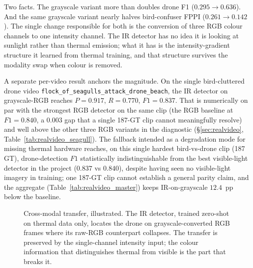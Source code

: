 \documentclass[12pt,a4paper,oneside,openright]{book}
\begin{document}
Two facts. The grayscale variant more than doubles drone F1 ($0.295 \to 0.636$). And the same grayscale variant nearly halves bird-confuser FPPI ($0.261 \to 0.142$). The single change responsible for both is the conversion of three RGB colour channels to one intensity channel. The IR detector has no idea it is looking at sunlight rather than thermal emission; what it has is the intensity-gradient structure it learned from thermal training, and that structure survives the modality swap when colour is removed.

A separate per-video result anchors the magnitude. On the single bird-cluttered drone video \texttt{flock\_of\_seagulls\_attack\_drone\_beach}, the IR detector on grayscale-RGB reaches $P=0.917$, $R=0.770$, $F1=0.837$. That is numerically on par with the strongest RGB detector on the same clip (the RGB baseline at $F1=0.840$, a $0.003$ gap that a single 187-GT clip cannot meaningfully resolve) and well above the other three RGB variants in the diagnostic (\S\ref{sec:realvideo}, Table~\ref{tab:realvideo_seagull}). The fallback intended as a degradation mode for missing thermal hardware reaches, on this single hardest bird-vs-drone clip (187 GT), drone-detection $F1$ statistically indistinguishable from the best visible-light detector in the project ($0.837$ vs $0.840$), despite having seen no visible-light imagery in training; one 187-GT clip cannot establish a general parity claim, and the aggregate (Table~\ref{tab:realvideo_master}) keeps IR-on-grayscale $12.4$~pp below the baseline.

\begin{figure}[htbp]
    \centering
    \caption{Cross-modal transfer, illustrated. The IR detector, trained zero-shot on thermal data only, locates the drone on grayscale-converted RGB frames where its raw-RGB counterpart collapses. The transfer is preserved by the single-channel intensity input; the colour information that distinguishes thermal from visible is the part that breaks it.}
    \label{fig:grayscale_qualitative}
\end{figure}
\end{document}
